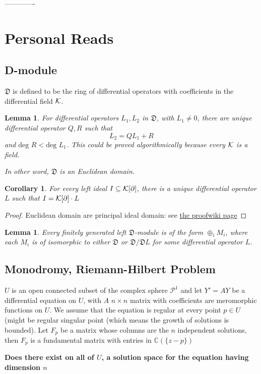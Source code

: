 \documentclass[11pt]{article}
\newtheorem{lemma}[thm]{Lemma}
\newtheorem{cor}[thm]{Corollary}
\newcommand{\pd}{\partial}
\newcommand{\cplx}{\mathbb C}
\newcommand{\frakd}{{\mathfrak D}}
\newcommand{\calk}{{\cal K}}
\begin{document}
-------------
\section{Personal Reads}
\subsection{D-module}
$\frakd$ is defined to be the ring of differential operators with coefficients in the differential field $\calk$.
\begin{lemma}
For differential operators $L_1,L_2$ in $\frakd$, with $L_1\neq 0$, there are unique differential operator $Q,R$ such that 
$$
L_2=Q L_1+R
$$
and $\text{deg } R<\text{deg } L_1$. This could be proved algorithmically because every $\calk$ is a field.

In other word, $\frakd$ is  an Euclidean domain.
\end{lemma}
\begin{cor}
For every left ideal $I\subseteq \calk[\pd]$, there is a unique differential operator $L$ such that $I=\calk[\pd]\cdot L$
\end{cor}
\begin{proof}
Euclidean domain are principal ideal domain: see \href{https://proofwiki.org/wiki/Euclidean_Domain_is_Principal_Ideal_Domain}{the proofwiki page}
\end{proof}
\begin{lemma}
Every finitely generated left $\frakd$-module is of the form $\oplus_i M_i$, where each $M_i$ is of isomorphic to either $\frakd$ or $\frakd/\frakd L$ for some differential operator $L$.
\end{lemma}
\subsection{Monodromy, Riemann-Hilbert Problem}
$U$ is an open connected subset of the complex sphere $\mathcal{P}^1$ and let $Y'=AY$ be a differential equation on $U$, with $ A$ $n\times n$ matrix with coefficients are meromorphic functions on $U$. We assume that the equation is regular at every point $p\in U$ (might be regular singular point (which means the growth of solutions is bounded). Let $F_p$ be a matrix whose columns are the $n$ independent solutions, then $F_p$ is a fundamental matrix with entries in $\cplx(\{z-p\})$

\textbf{Does there exist on all of $U$, a solution space for the equation having dimension $n$}
\end{document}
